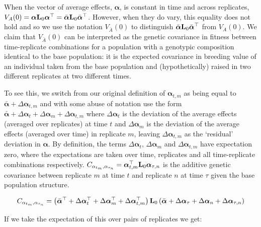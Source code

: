 \documentclass[12pt]{article}
\begin{document}
\begin{bibunit}
When the vector of average effects, ${\boldsymbol \alpha}$, is constant in time and across replicates, $V_A(0) = {\boldsymbol \alpha}{\bf L}_0{\boldsymbol \alpha}^{\top} = \bar{\boldsymbol \alpha}{\bf L}_0\bar{\boldsymbol \alpha}^{\top}$. However, when they do vary, this equality does not hold and so we use the notation $V_{\bar A}(0)$ to distinguish $\bar{\boldsymbol \alpha}{\bf L}_0\bar{\boldsymbol \alpha}^{\top}$ from $V_A(0)$. We claim that $V_{\bar A}(0)$ can be interpreted as the genetic covariance in fitness between time-replicate combinations for a population with a genotypic composition identical to the base population: it is the expected covariance in breeding value of an individual taken from the base population and (hypothetically) raised in two different replicates at two different times.

To see this, we switch from our original definition of ${\boldsymbol \alpha}_{t,m}$ as being equal to $\bar{\boldsymbol \alpha}+\Delta{\boldsymbol \alpha}_{t,m}$ and with some abuse of notation use the form $\bar{\boldsymbol \alpha}+\Delta{\boldsymbol \alpha}_t+\Delta{\boldsymbol \alpha}_m+\Delta{\boldsymbol \alpha}_{t,m}$ where $\Delta{\boldsymbol \alpha}_t$ is the deviation of the average effects (averaged over replicates) at time $t$ and $\Delta{\boldsymbol \alpha}_m$ is the deviation of the average effects (averaged over time) in replicate $m$, leaving $\Delta{\boldsymbol \alpha}_{t,m}$ as the `residual' deviation in ${\boldsymbol \alpha}$. By definition, the terms
 $\Delta{\boldsymbol \alpha}_t$, $\Delta{\boldsymbol \alpha}_m$ and $\Delta{\boldsymbol \alpha}_{t,m}$ have expectation zero, where the expectations are taken over time, replicates and all time-replicate combinations respectively. $C_{\alpha_{t_m}, \alpha_{\tau_n}}={\boldsymbol \alpha}^{\top}_{t,m}{\bf L}_0{\boldsymbol \alpha}_{\tau,n}$ is the additive genetic covariance between replicate $m$ at time $t$ and replicate $n$ at time $\tau$ given the base population structure.


 \begin{equation}
C_{\alpha_{t_m}, \alpha_{\tau_n}} = \left(\bar{\boldsymbol \alpha}^{\top}+\Delta{\boldsymbol \alpha}_t^{\top}+\Delta{\boldsymbol \alpha}_m^{\top}+\Delta{\boldsymbol \alpha}_{t,m}^{\top}\right){\bf L}_0\left(\bar{\boldsymbol \alpha}+\Delta{\boldsymbol \alpha}_\tau+\Delta{\boldsymbol \alpha}_n+\Delta{\boldsymbol \alpha}_{\tau,n}\right)
 \end{equation}

If we take the expectation of this over pairs of replicates we get:


\end{bibunit}
\end{document}
